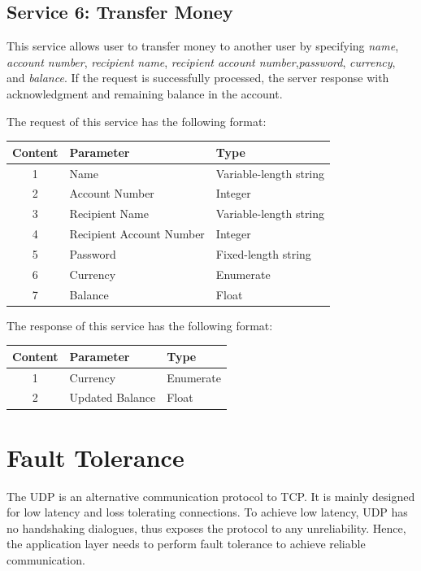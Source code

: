 \documentclass[12pt]{article}
\begin{document}
\subsection{Service 6: Transfer Money}
This service allows user to transfer money to another user by specifying \textit{name}, \textit{account number}, \textit{recipient name}, \textit{recipient account number},\textit{password}, \textit{currency}, and \textit{balance}. If the request is successfully processed, the server response with acknowledgment and remaining balance in the account.

The request of this service has the following format:

\noindent\begin{minipage}{\linewidth}
	\centering
	\begin{tabular}{c l l}
    \hline
    \textbf{Content} & \textbf{Parameter} & \textbf{Type}\\
    \hline
    1 & Name & Variable-length string \\
    2 & Account Number & Integer \\
    3 & Recipient Name & Variable-length string \\
    4 & Recipient Account Number & Integer \\
    5 & Password & Fixed-length string \\
    6 & Currency & Enumerate \\
    7 & Balance & Float \\
    \hline
	\end{tabular}
\end{minipage}

The response of this service has the following format:

\noindent\begin{minipage}{\linewidth}
	\centering
	\begin{tabular}{c l l}
  	\hline
    \textbf{Content} & \textbf{Parameter} & \textbf{Type}\\
    \hline
    1 & Currency & Enumerate \\
    2 & Updated Balance & Float \\
    \hline
	\end{tabular}
\end{minipage}


\pagebreak
\section{Fault Tolerance}
The UDP is an alternative communication protocol to TCP. It is mainly designed for low latency and loss tolerating connections. To achieve low latency, UDP has no handshaking dialogues, thus exposes the protocol to any unreliability. Hence, the application layer needs to perform fault tolerance to achieve reliable communication.
\end{document}
